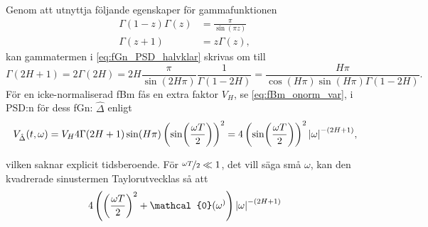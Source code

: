 Genom att utnyttja följande egenskaper för gammafunktionen
\begin{align}
\Gamma(1-z)\Gamma(z)&=\frac{\pi}{\sin(\pi z)} \\
\Gamma(z+1)&=z\Gamma(z),
\end{align}
kan gammatermen i \eqref{eq:fGn_PSD_halvklar} skrivas om till
\begin{equation}
\Gamma(2H+1) 
= 2 \Gamma(2H) = 2H\frac{\pi}{\sin(2H\pi)}\frac{1}{\Gamma(1-2H)} 
= \frac{H\pi}{\cos(H\pi)\sin(H\pi)\Gamma(1-2H)}.
\end{equation}
För en icke-normaliserad fBm fås en extra faktor $V_H$, se \eqref{eq:fBm_onorm_var}, i PSD:n för dess fGn: $\hat{\Delta}$ enligt
\begin{equation}
V_{\hat{\Delta}}(t,\omega) 
= V_H 4\Gamma{(2H+1)}\sin(H\pi) \left( \sin(\frac{\omega T}{2}) \right) ^2 
= 4 \left( \sin(\frac{\omega T}{2}) \right) ^2\abs{\omega}^{-(2H+1)},
\end{equation}

vilken saknar explicit tidsberoende. För $\nicefrac{\omega T}{2} \ll 1$, det vill säga små $\omega$, kan den kvadrerade sinustermen Taylorutvecklas så att
\begin{equation}
    4 \left( \left(\frac{\omega T}{2} \right)^2 + \mathcal{0}(\omega^) \right) \abs{\omega}^{-(2H+1)}
\end{equation}







